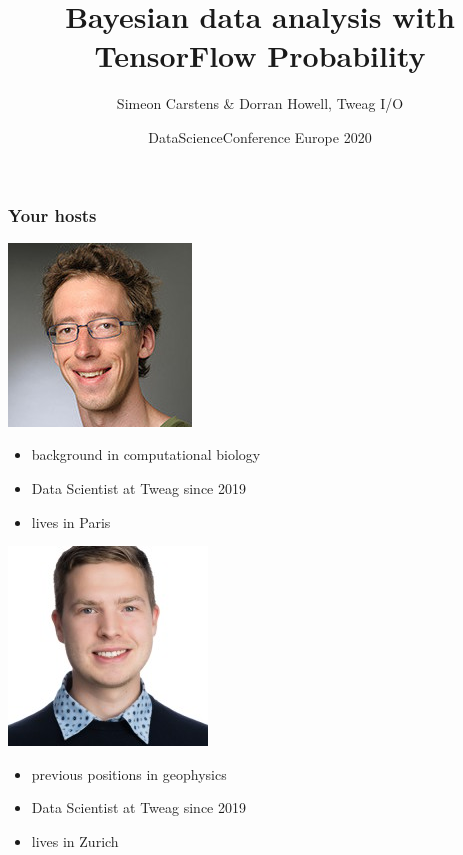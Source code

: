 \documentclass[t,aspectratio=169]{beamer}
\title{Bayesian data analysis with TensorFlow Probability}
\date{DataScienceConference Europe 2020}
\author{Simeon Carstens \& Dorran Howell, Tweag I/O}
\begin{document}
\begin{frame}
  \titlepage
\end{frame}


\begin{frame}
  \frametitle{Your hosts}
  \begin{tcolorbox}[title=Simeon (presentation)]
    \begin{minipage}{0.3\textwidth}{
        \includegraphics[width=0.15\paperwidth]{images/simeon}}
    \end{minipage}
    \begin{minipage}{0.6\textwidth}
    \begin{itemize}
    \item background in computational biology
    \item Data Scientist at Tweag since 2019
    \item lives in Paris
    \end{itemize}
    \end{minipage}
  \end{tcolorbox}

  \begin{tcolorbox}[title=Dorran (interactive demos \& questions in chat)]
    \begin{minipage}{0.3\textwidth}{
        \includegraphics[width=0.15\paperwidth]{images/dorran}}
    \end{minipage}
    \begin{minipage}{0.6\textwidth}
    \begin{itemize}
    \item previous positions in geophysics
    \item Data Scientist at Tweag since 2019
    \item lives in Zurich
    \end{itemize}
    \end{minipage}
  \end{tcolorbox}
\end{frame}
\end{document}
